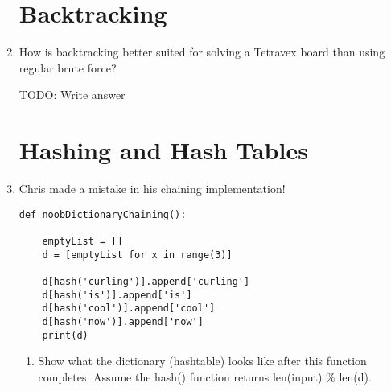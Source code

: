\documentclass[11pt]{article}
\newenvironment{answer}{\large\lstset{basicstyle=\large}\color{white}}{}
\newenvironment{answer}{\large\lstset{basicstyle=\large}\color{red}}{}
\begin{document}
\begin{enumerate}
\begin{answer}
    \end{answer}

\section*{Backtracking}

\item How is backtracking better suited for solving a Tetravex board than
      using regular brute force?

    \begin{answer}
    \Huge TODO: Write answer
    \end{answer}

\pagebreak
\section*{Hashing and Hash Tables}

\item Chris made a mistake in his chaining implementation!

\begin{lstlisting}
def noobDictionaryChaining():

    emptyList = []
    d = [emptyList for x in range(3)]

    d[hash('curling')].append['curling']
    d[hash('is')].append['is']
    d[hash('cool')].append['cool']
    d[hash('now')].append['now']
    print(d)
\end{lstlisting}

    \begin{enumerate}
    \item Show what the dictionary (hashtable) looks like after this function
          completes. Assume the hash() function returns len(input) \% len(d).

        \begin{answer}
            \begin{tabular}{l | r}
    

\end{tabular}
\end{answer}
\end{enumerate}
\end{enumerate}
\end{document}
